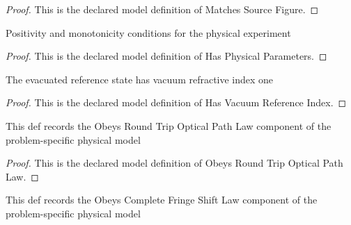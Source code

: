 \begin{proof}
  This is the declared model definition of Matches Source Figure.
\end{proof}
\begin{definition}
  \label{def:physics:phyx-mini-0250:phyxminiproblems-problemphyxmini0250-hasphysicalparameters}
  Positivity and monotonicity conditions for the physical experiment
\end{definition}
\begin{proof}
  This is the declared model definition of Has Physical Parameters.
\end{proof}
\begin{definition}
  \label{def:physics:phyx-mini-0250:phyxminiproblems-problemphyxmini0250-hasvacuumreferenceindex}
  The evacuated reference state has vacuum refractive index one
\end{definition}
\begin{proof}
  This is the declared model definition of Has Vacuum Reference Index.
\end{proof}
\begin{definition}
  \label{def:physics:phyx-mini-0250:phyxminiproblems-problemphyxmini0250-obeysroundtripopticalpathlaw}
  This def records the Obeys Round Trip Optical Path Law component of the problem-specific physical model
\end{definition}
\begin{proof}
  This is the declared model definition of Obeys Round Trip Optical Path Law.
\end{proof}
\begin{definition}
  \label{def:physics:phyx-mini-0250:phyxminiproblems-problemphyxmini0250-obeyscompletefringeshiftlaw}
  This def records the Obeys Complete Fringe Shift Law component of the problem-specific physical model
\end{definition}
